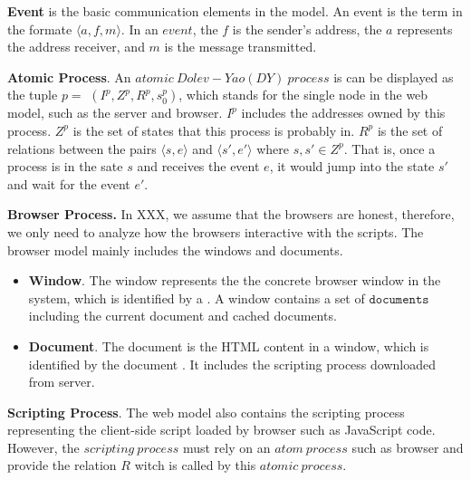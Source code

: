 \vspace{1mm}\noindent\textbf{Event } is the basic communication elements in the model.  An event is the term in the formate $\langle a, f, m \rangle$. In an $event$, the $f$ is the sender's address, the $a$ represents the address receiver, and $m$ is the message transmitted. 

\vspace{1mm}\noindent\textbf{Atomic Process}.  An $atomic\ Dolev-Yao (DY)\ process$ is can be displayed as the tuple $p=$ $(I^p, Z^p, R^p,s_0^p )$, which stands for the single node in the web model, such as the server and browser. $I^p$ includes the addresses owned by this process. $Z^p$ is the set of states that this process is probably in. $R^p$ is the set of relations between the pairs $\langle s, e \rangle$ and $\langle s', e' \rangle$ where $s, s' \in Z^p$.
That is, once a process is in the sate $s$ and receives the event $e$, it would jump into the state $s'$ and wait for the event $e'$.

\noindent\textbf{Browser Process.}
In XXX, we assume that the browsers are honest, therefore, we only need to analyze how the browsers interactive with the scripts. 
The browser model mainly includes the windows and documents.
\begin{itemize}
\item \noindent\textbf{Window}. The window  represents the  the concrete browser window in the system, which is identified by a . A window contains a set of $\mathtt{documents}$ including the current document and cached documents. 
\item \noindent\textbf{Document}. The document is the HTML content in a window, which is identified by the document . It includes the scripting process downloaded from server.
\end{itemize}


\vspace{1mm}\noindent\textbf{Scripting Process}. The web model also contains the scripting process representing the client-side script loaded by browser such as JavaScript code. However, the $scripting\ process$ must rely on an $atom\ process$ such as browser and provide the relation $R$ witch is called by this $atomic\ process$. 

